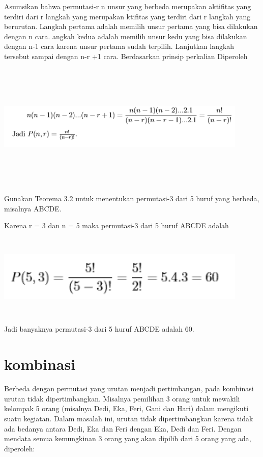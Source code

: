 \documentclass[11pt,fleqn]{book} %
\begin{document}
Asumsikan bahwa permutasi-r n unsur yang berbeda merupakan aktifitas yang terdiri dari r langkah yang merupakan ktifitas yang terdiri dari r langkah yang berurutan. Langkah pertama adalah memilih unsur pertama yang bisa dilakukan dengan n cara. angkah kedua adalah memilih unsur kedu yang bisa dilakukan dengan n-1 cara karena unsur pertama sudah terpilih. Lanjutkan langkah tersebut sampai dengan n-r +1 cara. Berdasarkan prinsip perkalian Diperoleh


\includegraphics[width = 12cm, height= 6cm]{Pictures/herlin2.png}

Gunakan Teorema 3.2 untuk menentukan permutasi-3 dari 5 huruf yang berbeda, misalnya ABCDE.


Karena r = 3 dan n = 5 maka permutasi-3 dari 5 huruf ABCDE adalah

\includegraphics[width = 12cm, height= 4cm]{Pictures/herlin3.png}

Jadi banyaknya permutasi-3 dari 5 huruf ABCDE adalah 60.

\section{kombinasi}


Berbeda dengan permutasi yang urutan menjadi pertimbangan, pada kombinasi urutan tidak dipertimbangkan. Misalnya pemilihan 3 orang untuk mewakili kelompak 5 orang (misalnya Dedi, Eka, Feri, Gani dan Hari) dalam mengikuti suatu kegiatan. Dalam masalah ini, urutan tidak dipertimbangkan karena tidak ada bedanya antara Dedi, Eka dan Feri dengan Eka, Dedi dan Feri. Dengan mendata semua kemungkinan 3 orang yang akan dipilih dari 5 orang yang ada, diperoleh:
\end{document}
